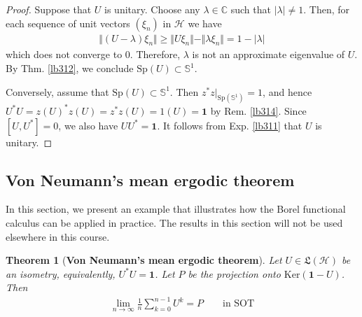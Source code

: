 \documentclass[12pt,b5paper,notitlepage]{article}
\theoremstyle{definition}
\newtheorem{df}{Definition}[subsection]
\theoremstyle{plain}
\newtheorem{thm}[df]{Theorem}
\newcommand{\fk}{\mathfrak}
\newcommand{\idt}{\mathbf{1}}
\newcommand{\Cbb}{\mathbb C}
\newcommand{\Ker}{\mathrm{Ker}}
\newcommand{\Sp}{\mathrm{Sp}}
\newcommand{\Sbb}{{\mathbb S}}
\newcommand{\Fbb}{\mathbb F}
\newcommand{\Lin}{\mathrm{Lin}}
\newcommand{\MH}{\mathcal H}
\numberwithin{equation}{section}
\begin{document}
\begin{proof}
Suppose that $U$ is unitary. Choose any $\lambda\in\Cbb$ such that $|\lambda|\neq 1$. Then, for each sequence of unit vectors $(\xi_n)$ in $\MH$ we have
\begin{align*}
\Vert (U-\lambda)\xi_n\Vert\geq \Vert U\xi_n\Vert-\Vert\lambda\xi_n\Vert=1-|\lambda|
\end{align*}
which does not converge to $0$. Therefore, $\lambda$ is not an approximate eigenvalue of $U$. By Thm. \ref{lb312}, we conclude $\Sp(U)\subset\Sbb^1$.

Conversely, assume that $\Sp(U)\subset\Sbb^1$. Then $z^*z|_{\Sp(\Sbb^1)}=1$, and hence $U^*U=z(U)^*z(U)=z^*z(U)=1(U)=\idt$ by Rem. \ref{lb314}. Since $[U,U^*]=0$, we also have $UU^*=\idt$. It follows from Exp. \ref{lb311} that $U$ is unitary.
\end{proof}











\begin{comment}
\begin{df}
Let $V$ is an $\Fbb$-vector space $T\in\Lin(V)$. Let $\lambda\in\Fbb$. We say that $\xi\in V$ is an \textbf{$\pmb\lambda$-eigenvector} of $T$ if $T\xi=\lambda\xi$. If there exists a non-zero $\lambda$-eigenvector of $T$, we say that $\lambda$ is an \textbf{eigenvalue} of $T$. \index{00@Eigenvalues and eigenvectors}
\end{df}
\end{comment}









\subsection{Von Neumann's mean ergodic theorem}

In this section, we present an example that illustrates how the Borel functional calculus can be applied in practice. The results in this section will not be used elsewhere in this course.



\begin{thm}[\textbf{Von Neumann's mean ergodic theorem}]\label{lb321}
Let $U\in\fk L(\MH)$ be an isometry, equivalently, $U^*U=\idt$. Let $P$ be the projection onto $\Ker(\idt-U)$. Then
\begin{align}\label{eq169}
\lim_{n\rightarrow\infty}\frac 1{n}\sum_{k=0}^{n-1}U^k=P\qquad\text{in SOT}
\end{align}
\end{thm}
\end{document}
